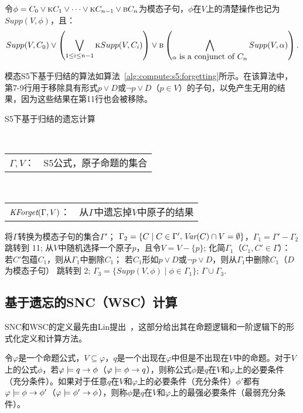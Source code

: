 令$\phi=C_0 \vee \textsc{k} C_1 \vee \dots \vee \textsc{k} C_{n-1} \vee \textsc{b} C_n$为模态子句，$\phi$在$V$上的清楚操作也记为$Supp(V,\phi)$，且：
$$Supp(V, C_0) \vee \left(\bigvee_{1\leq i\leq n-1} \textsc{k} Supp(V, C_i)\right) \vee \textsc{b}\left(\bigwedge_{\alpha\hbox{ is a conjunct of $C_n$}} Supp(V, \alpha)\right).$$

模态S5下基于归结的算法如算法~\ref{alg:compute:s5:forgetting}所示。在该算法中，第7-9行用于移除具有形式$p\vee D$或$\neg p \vee D$（$p\in V$）的子句，以免产生无用的结果，因为这些结果在第11行也会被移除。


\begin{algorithm}[htbp]
	\small
	\caption{S5下基于归结的遗忘计算~\cite{feng2018strongest}}
	\label{alg:compute:s5:forgetting}
	\begin{algorithmic}[1]
		\REQUIRE ~~\\
		\begin{tabular}[t]{p{8mm}l}
			$\Gamma, V$：& S5公式，原子命题的集合
		\end{tabular}
		\ENSURE ~~\\
		\begin{tabular}[t]{p{8mm}l}
			$\textit{KForget}(\Gamma, V)$：  & \qquad \quad 从$\Gamma$中遗忘掉$V$中原子的结果
		\end{tabular}
		\STATE 将$\Gamma$转换为模态子句的集合$\Gamma'$；
		\STATE $\Gamma_2=\{C\mid C\in \Gamma', \textit{Var}(C) \cap V = \emptyset\}$，$\Gamma_1=\Gamma' - \Gamma_2$
		\STATE 跳转到 11;
		\ENDIF
		\STATE 从$V$中随机选择一个原子$p$，且令$V = V -\{p\}$;
		\STATE 化简$\Gamma_1$（$C_1, C'\in \Gamma$）：
		\STATE \qquad 若$C'$包蕴$C_1$，则从$\Gamma_1$中删除$C_1$；
		\STATE \qquad 若$C_1$形如$p\vee D$或$\neg p \vee D$，则从$\Gamma_1$中删除$C_1$（$D$为模态子句）
		\STATE 跳转到 2;
		\STATE $\Gamma_3=\{Supp(V, \phi) \mid \phi \in \Gamma_1\}$;
		\RETURN $\Gamma \cup \Gamma_3$.
	\end{algorithmic}
\end{algorithm}


\subsection{基于遗忘的SNC（WSC）计算}
SNC和WSC的定义最先由Lin提出~\cite{DBLP:journals/ai/Lin01}，这部分给出其在命题逻辑和一阶逻辑下的形式化定义和计算方法。

\begin{definition}
	令$\varphi$是一个命题公式，$V\subseteq \varphi$，$q$是一个出现在$\varphi$中但是不出现在$V$中的命题。对于$V$上的公式$\phi$，若$\varphi \models q \rightarrow \phi$（$\varphi \models \phi \rightarrow q$），则称公式$\phi$是$q$在$V$和$\varphi$上的必要条件（充分条件）。如果对于任意$q$在$V$和$\varphi$上的必要条件（充分条件）$\phi'$都有$\varphi \models \phi \rightarrow \phi'$（$\varphi \models \phi' \rightarrow \phi$），则称$\phi$是$q$在$V$和$\varphi$上的最强必要条件（最弱充分条件）。
\end{definition}

